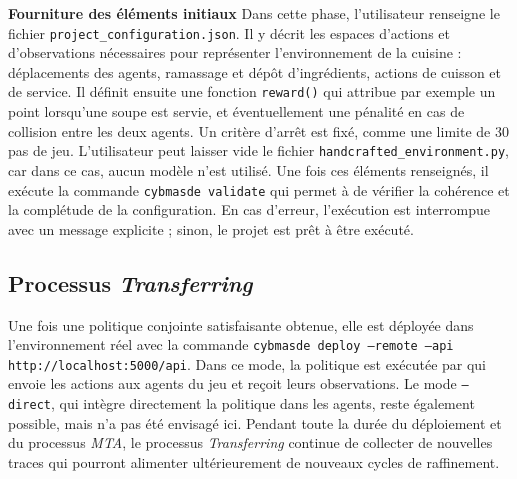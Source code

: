 \noindent
\textbf{Fourniture des éléments initiaux} \quad
Dans cette phase, l'utilisateur renseigne le fichier \texttt{project\_configuration.json}. Il y décrit les espaces d'actions et d'observations nécessaires pour représenter l'environnement de la cuisine : déplacements des agents, ramassage et dépôt d'ingrédients, actions de cuisson et de service. Il définit ensuite une fonction \texttt{reward()} qui attribue par exemple un point lorsqu'une soupe est servie, et éventuellement une pénalité en cas de collision entre les deux agents. Un critère d'arrêt est fixé, comme une limite de 30 pas de jeu. L'utilisateur peut laisser vide le fichier \texttt{handcrafted\_environment.py}, car dans ce cas, aucun modèle  n'est utilisé. Une fois ces éléments renseignés, il exécute la commande \texttt{cybmasde validate} qui permet à  de vérifier la cohérence et la complétude de la configuration. En cas d'erreur, l'exécution est interrompue avec un message explicite ; sinon, le projet est prêt à être exécuté.

\subsection{Processus \textit{Transferring}}
Une fois une politique conjointe satisfaisante obtenue, elle est déployée dans l’environnement réel avec la commande \texttt{cybmasde deploy --remote --api http://localhost:5000/api}. Dans ce mode, la politique est exécutée par  qui envoie les actions aux agents du jeu et reçoit leurs observations. Le mode \texttt{--direct}, qui intègre directement la politique dans les agents, reste également possible, mais n'a pas été envisagé ici. Pendant toute la durée du déploiement et du processus \textit{MTA}, le processus \textit{Transferring} continue de collecter de nouvelles traces qui pourront alimenter ultérieurement de nouveaux cycles de raffinement.

